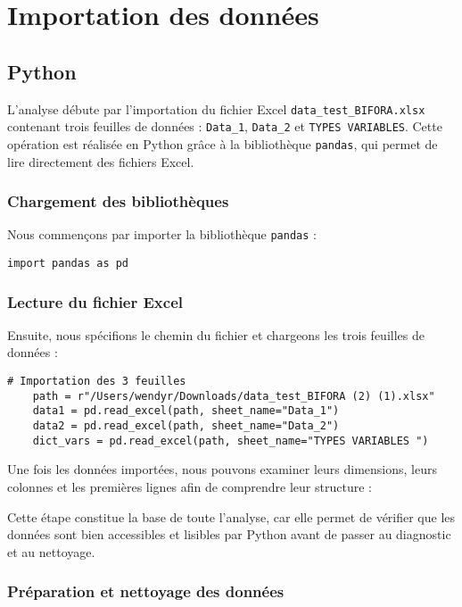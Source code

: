 \section{Importation des données}

\subsection{Python}

L’analyse débute par l’importation du fichier Excel \texttt{data\_test\_BIFORA.xlsx} contenant trois feuilles de données : 
\texttt{Data\_1}, \texttt{Data\_2} et \texttt{TYPES VARIABLES}. 
Cette opération est réalisée en Python grâce à la bibliothèque \texttt{pandas}, qui permet de lire directement des fichiers Excel.

\subsubsection{Chargement des bibliothèques}
Nous commençons par importer la bibliothèque \texttt{pandas} :

\begin{lstlisting}[caption=Importation bibliothèque Pandas]
import pandas as pd
\end{lstlisting}


\subsubsection{Lecture du fichier Excel}
Ensuite, nous spécifions le chemin du fichier et chargeons les trois feuilles de données :

\begin{lstlisting}[caption=Importation du fichier Excel]
    # Importation des 3 feuilles
    path = r"/Users/wendyr/Downloads/data_test_BIFORA (2) (1).xlsx"
    data1 = pd.read_excel(path, sheet_name="Data_1")
    data2 = pd.read_excel(path, sheet_name="Data_2")
    dict_vars = pd.read_excel(path, sheet_name="TYPES VARIABLES ")
    \end{lstlisting}

Une fois les données importées, nous pouvons examiner leurs dimensions, leurs colonnes et les premières lignes afin de comprendre leur structure :


Cette étape constitue la base de toute l'analyse, car elle permet de vérifier que les données sont bien accessibles et lisibles par Python avant de passer au diagnostic et au nettoyage.
\subsubsection{Préparation et nettoyage des données}

